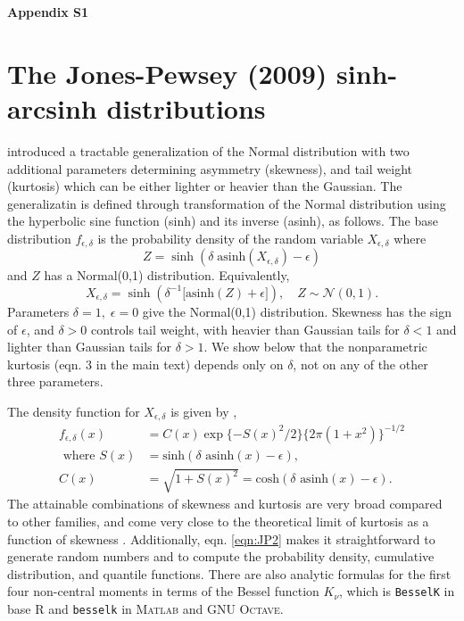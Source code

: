 \documentclass[12pt]{article}
\newcommand{\be}{\begin{equation}}
\newcommand{\ee}{\end{equation}}
\begin{document}
\newpage 
\clearpage 
\appendix



\begin{spacing}{1.35} 
	\linenumbers
	\centerline{\Large{\textbf{Appendix S1}}}
	\renewcommand{\thetable}{S-\arabic{table}}
	\renewcommand{\thefigure}{S-\arabic{figure}}
	\renewcommand{\thesection}{S.\arabic{section}}
	\renewcommand{\theequation}{S\arabic{equation}}
	\setcounter{page}{1}
	\setcounter{equation}{0}
	\setcounter{figure}{0}
	\setcounter{section}{0}
	\setcounter{table}{0}
	\section{The Jones-Pewsey (2009) sinh-arcsinh distributions}
	\citet{jones-pewsey-2009} introduced a tractable generalization of the Normal distribution with two 
	additional parameters determining asymmetry (skewness), and tail weight (kurtosis) which can be either 
	lighter or heavier than the Gaussian. The generalizatin is defined through transformation of the
	Normal distribution using the hyperbolic sine function (sinh) and its inverse (asinh), 
	as follows. The base distribution $f_{\epsilon,\delta}$  is the 
	probability density of the random variable $X_{\epsilon,\delta}$ where  
	\be
	Z = \sinh (\delta \; \mbox{asinh}(X_{\epsilon,\delta}) - \epsilon)
	\label{eqn:JP1}
	\ee
	and $Z$ has a Normal(0,1) distribution. Equivalently, 
	\be
	X_{\epsilon,\delta} = \sinh \left( \delta^{-1} \big[\mbox{asinh}(Z) + \epsilon \big] \right), \quad Z \sim \mathcal{N}(0,1).
	\label{eqn:JP2}
	\ee
	Parameters $\delta=1, \; \epsilon=0$ give the Normal(0,1) distribution. Skewness has the sign of $\epsilon$, and
	$\delta > 0$ controls tail weight, with heavier than Gaussian tails for $\delta<1$ and lighter than Gaussian tails for $\delta > 1$. We show below that the nonparametric kurtosis (eqn. 3 in the main text) depends 
	only on $\delta$, not on any of the other three parameters. 
	
	The density function for $X_{\epsilon,\delta}$ is given by \citet[][eqn. 2]{jones-pewsey-2009}, 
	\be
	\begin{aligned}
		f_{ \epsilon,\delta}(x) & = C(x) \exp\{-S(x)^2/2\} \{2\pi(1+x^2)\}^{-1/2}  \\
		\mbox{ where }  S(x) & =  \mbox{sinh}(\delta \mbox{ asinh}(x)- \epsilon), \\
		C(x)  & =  \sqrt{1 + S(x)^2} = \mbox{cosh}(\delta \mbox{ asinh}(x)- \epsilon).
	\end{aligned} 
	\ee
	The attainable combinations of skewness and kurtosis are 
	very broad compared to other families, and come very close to the theoretical limit of
	kurtosis as a function of skewness \citep[][Fig.  2]{jones-pewsey-2009}. 
	Additionally, eqn. \eqref{eqn:JP2} makes it straightforward to generate random numbers and to compute 
	the probability density, cumulative distribution, and quantile functions. 
	There are also analytic formulas for the first four non-central 
	moments \citep[][p. 764]{jones-pewsey-2009} in terms of the Bessel function $K_{\nu}$, which is
	\texttt{BesselK} in base R and \texttt{besselk} in \textsc{Matlab} and GNU \textsc{Octave}.
	

\end{spacing}
\end{document}
